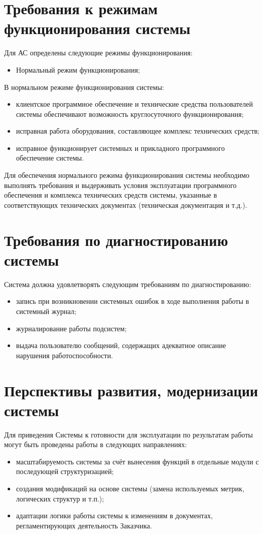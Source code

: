 \section{Требования к режимам функционирования системы}
Для АС определены следующие режимы функционирования:
\begin{itemize}
    \item Нормальный режим функционирования;
\end{itemize}
В нормальном режиме функционирования системы:
\begin{itemize}
    \item клиентское программное обеспечение и технические средства пользователей системы 
        обеспечивают возможность круглосуточного функционирования;
    \item исправная работа оборудования, составляющее комплекс технических средств;
    \item исправное функционирует системных и прикладного программного обеспечение системы.
\end{itemize}
Для обеспечения нормального режима функционирования системы необходимо выполнять требования и 
выдерживать условия эксплуатации программного обеспечения и комплекса технических средств системы, 
указанные в соответствующих технических документах (техническая документация и т.д.).

\section{Требования по диагностированию системы}
Система должна удовлетворять следующим требованиям по диагностированию:
\begin{itemize}
    \item запись при возникновении системных ошибок в ходе выполнения работы в системный журнал;
    \item журналирование работы подсистем;
    \item выдача пользователю сообщений, содержащих адекватное описание нарушения 
        работоспособности.
\end{itemize}

\section{Перспективы развития, модернизации системы}
Для приведения Системы к готовности для эксплуатации по результатам работы могут быть 
проведены работы в следующих направлениях:
\begin{itemize}
    \item масштабируемость системы за счёт вынесения функций в отдельные модули с 
        последующей структуризацией;
    \item создания модификаций на основе системы (замена используемых метрик, логических 
        структур и т.п.);
    \item адаптации логики работы системы к изменениям в документах, регламентирующих 
        деятельность Заказчика.
\end{itemize}

